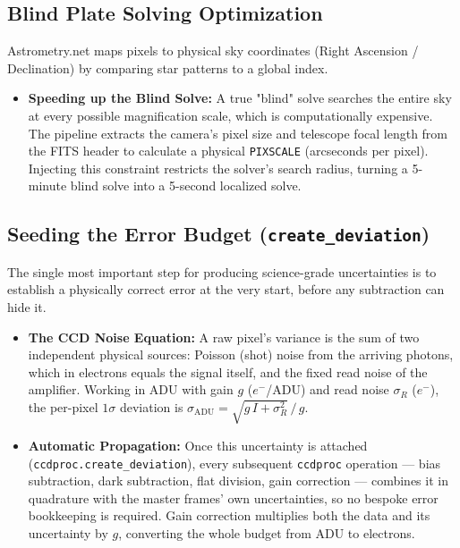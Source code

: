 \documentclass[11pt,a4paper]{article}
\begin{document}
\subsection{Blind Plate Solving Optimization}\label{app:wcs}
Astrometry.net maps pixels to physical sky coordinates (Right Ascension / Declination) by comparing star patterns to a global index.
\begin{itemize}[leftmargin=*]
    \item \textbf{Speeding up the Blind Solve:} A true "blind" solve searches the entire sky at every possible magnification scale, which is computationally expensive. The pipeline extracts the camera's pixel size and telescope focal length from the FITS header to calculate a physical \texttt{PIXSCALE} (arcseconds per pixel). Injecting this constraint restricts the solver's search radius, turning a 5-minute blind solve into a 5-second localized solve.
\end{itemize}

\subsection{Seeding the Error Budget (\texttt{create\_deviation})}\label{app:errbudget}
The single most important step for producing science-grade uncertainties is to establish a physically correct error at the very start, before any subtraction can hide it.
\begin{itemize}[leftmargin=*]
    \item \textbf{The CCD Noise Equation:} A raw pixel's variance is the sum of two independent physical sources: Poisson (shot) noise from the arriving photons, which in electrons equals the signal itself, and the fixed read noise of the amplifier. Working in ADU with gain $g$ ($e^-$/ADU) and read noise $\sigma_R$ ($e^-$), the per-pixel $1\sigma$ deviation is $\sigma_{\mathrm{ADU}} = \sqrt{g\,I + \sigma_R^2}\,/\,g$.
    \item \textbf{Automatic Propagation:} Once this uncertainty is attached (\texttt{ccdproc.create\_deviation}), every subsequent \texttt{ccdproc} operation --- bias subtraction, dark subtraction, flat division, gain correction --- combines it in quadrature with the master frames' own uncertainties, so no bespoke error bookkeeping is required. Gain correction multiplies both the data and its uncertainty by $g$, converting the whole budget from ADU to electrons.
\end{itemize}
\end{document}

